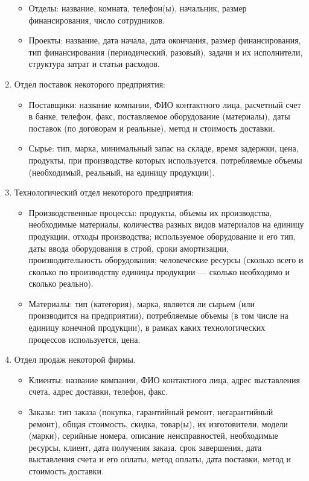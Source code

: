 \documentclass[12pt, openany, twoside]{book} %
\begin{document}
\begin{enumerate}
\begin{itemize}
\item Отделы: название, комната, телефон(ы), начальник, размер финансирования, число сотрудников.
\item Проекты: название, дата начала, дата окончания, размер финансирования, тип финансирования (периодический, разовый), задачи и их исполнители, структура затрат и статьи расходов.
\end{itemize}
\item Отдел поставок некоторого предприятия:
\begin{itemize}
\item Поставщики: название компании, ФИО контактного лица, расчетный счет в банке, телефон, факс, поставляемое оборудование (материалы), даты поставок (по договорам и реальные), метод и стоимость доставки.
\item Сырье: тип, марка, минимальный запас на складе, время задержки, цена, продукты, при производстве которых используется, потребляемые объемы (необходимый, реальный, на единицу продукции).
\end{itemize}
\item Технологический отдел некоторого предприятия:
\begin{itemize}
\item Производственные процессы: продукты, объемы их производства, необходимые материалы, количества разных видов материалов на единицу продукции, отходы производства; используемое оборудование и его тип, даты ввода оборудования в строй, сроки амортизации, производительность оборудования; человеческие ресурсы (сколько всего и сколько по производству единицы продукции --- сколько необходимо и сколько реально).
\item Материалы: тип (категория), марка, является ли сырьем (или производится на предприятии), потребляемые объемы (в том числе на единицу конечной продукции), в рамках каких технологических процессов используется, цена.
\end{itemize}
\item Отдел продаж некоторой фирмы.
\begin{itemize}
\item Клиенты: название компании, ФИО контактного лица, адрес выставления счета, адрес доставки, телефон, факс.
\item Заказы: тип заказа (покупка, гарантийный ремонт, негарантийный ремонт), общая стоимость, скидка, товар(ы), их изготовители, модели (марки), серийные номера, описание неисправностей, необходимые ресурсы, клиент, дата получения заказа, срок завершения, дата выставления счета и его оплаты, метод оплаты, дата поставки, метод и стоимость доставки.

\end{itemize}
\end{enumerate}
\end{document}
